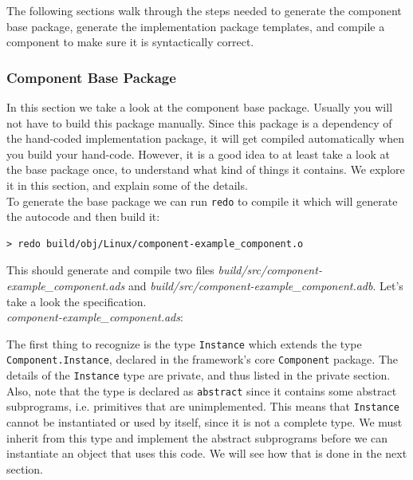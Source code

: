 The following sections walk through the steps needed to generate the component base package, generate the implementation package templates, and compile a component to make sure it is syntactically correct.

\subsubsection{Component Base Package} \label{Component Base Package}

In this section we take a look at the component base package. Usually you will not have to build this package manually. Since this package is a dependency of the hand-coded implementation package, it will get compiled automatically when you build your hand-code. However, it is a good idea to at least take a look at the base package once, to understand what kind of things it contains. We explore it in this section, and explain some of the details. \\

To generate the base package we can run \texttt{redo} to compile it which will generate the autocode and then build it:

\vspace{5mm} %
\begin{verbatim}
> redo build/obj/Linux/component-example_component.o
\end{verbatim}
\vspace{5mm} %

This should generate and compile two files \textit{build/src/component-example\_component.ads} and \textit{build/src/component-example\_component.adb}. Let's take a look the specification. \\

\textit{component-example\_component.ads}:

The first thing to recognize is the type \texttt{Instance} which extends the type \texttt{Component.Instance}, declared in the framework's core \texttt{Component} package. The details of the \texttt{Instance} type are private, and thus listed in the private section. Also, note that the type is declared as \texttt{abstract} since it contains some abstract subprograms, i.e. primitives that are unimplemented. This means that \texttt{Instance} cannot be instantiated or used by itself, since it is not a complete type. We must inherit from this type and implement the abstract subprograms before we can instantiate an object that uses this code. We will see how that is done in the next section. \\

